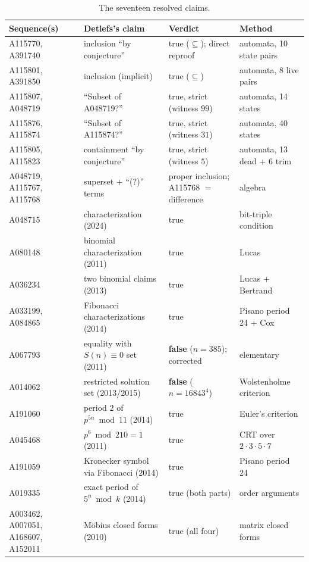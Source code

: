 \documentclass[11pt]{article}
\begin{document}
\begin{table}[ht]
\centering
\small
\begin{tabular}{@{}llll@{}}
\toprule
Sequence(s) & Detlefs's claim & Verdict & Method \\
\midrule
A115770, A391740 & inclusion ``by conjecture'' & true ($\subseteq$); direct reproof~\cite{trureturing2026}
  & automata, 10 state pairs \\
A115801, A391850 & inclusion (implicit) & true ($\subseteq$)
  & automata, 8 live pairs \\
A115807, A048719 & ``Subset of A048719?'' & true, strict (witness $99$)
  & automata, 14 states \\
A115876, A115874 & ``Subset of A115874?'' & true, strict (witness $31$)
  & automata, 40 states \\
A115805, A115823 & containment ``by conjecture'' & true, strict
  (witness $5$) & automata, 13 dead + 6 trim \\
A048719, A115767, A115768 & superset + ``(?)'' terms & proper inclusion;
  A115768 $=$ difference & algebra \\
A048715 & characterization (2024) & true & bit-triple condition \\
A080148 & binomial characterization (2011) & true & Lucas \\
A036234 & two binomial claims (2013) & true & Lucas + Bertrand \\
A033199, A084865 & Fibonacci characterizations (2014) & true
  & Pisano period 24 + Cox \\
A067793 & equality with $S(n)\equiv 0$ set (2011) & \textbf{false}
  ($n=385$); corrected & elementary \\
A014062 & restricted solution set (2013/2015) & \textbf{false}
  ($n=16843^4$) & Wolstenholme criterion \\
A191060 & period $2$ of $p^{5n} \bmod 11$ (2014) & true
  & Euler's criterion \\
A045468 & $p^6 \bmod 210 = 1$ (2011) & true
  & CRT over $2 \cdot 3 \cdot 5 \cdot 7$ \\
A191059 & Kronecker symbol via Fibonacci (2014) & true
  & Pisano period 24 \\
A019335 & exact period of $5^n \bmod k$ (2014) & true (both parts)
  & order arguments \\
A003462, A007051, A168607, A152011 & M\"obius closed forms (2010)
  & true (all four) & matrix closed forms \\
\bottomrule
\end{tabular}
\caption{The seventeen resolved claims.}
\label{tab:results}
\end{table}
\end{document}
